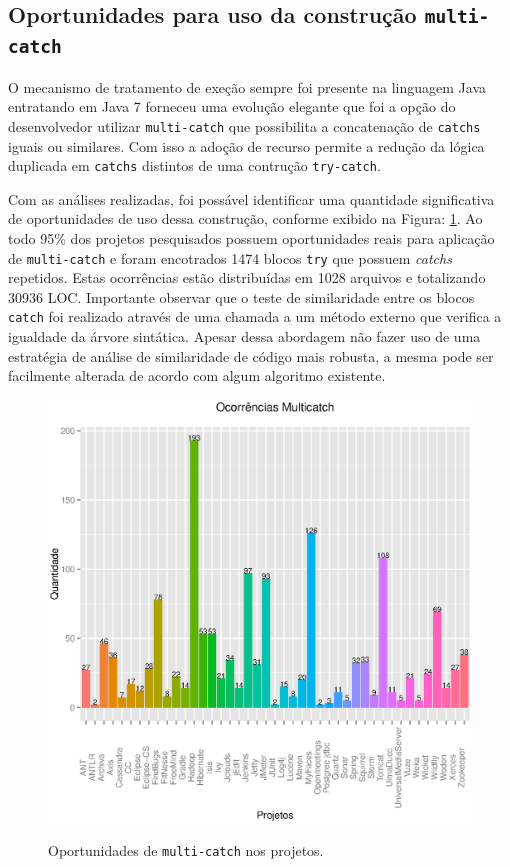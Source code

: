 \subsection{Oportunidades para uso da constru\c c\~{a}o \texttt{multi-catch}}

O mecanismo de tratamento de exeção sempre foi presente na linguagem Java entratando em Java 7 forneceu uma evolução elegante que foi a opção do desenvolvedor utilizar \texttt{multi-catch} que possibilita a concatenação de \texttt{catchs} iguais ou similares. Com isso a adoção de recurso permite a redução da lógica duplicada em \texttt{catchs} distintos de uma contrução \texttt{try-catch}.

Com as análises realizadas, foi possável identificar uma quantidade significativa de oportunidades 
de uso dessa construção, conforme exibido na Figura: \ref{fig:Muticatch}. Ao todo \num{95}\% dos projetos pesquisados possuem oportunidades reais para aplicação de \texttt{multi-catch} e
foram encotrados \num{1474} blocos \texttt{try} que possuem \textit{catchs} repetidos. 
Estas ocorrências estão distribuídas em \num{1028} arquivos e totalizando \num{30936} \acs{LOC}. 
Importante observar que o teste de  similaridade entre os blocos \texttt{catch} 
foi realizado através de uma chamada a um método externo que verifica a igualdade da árvore 
sintática. Apesar dessa abordagem não fazer uso de uma estratégia de análise 
de similaridade de código mais robusta, a mesma pode ser facilmente alterada de 
acordo com algum algoritmo existente. 

\begin{figure}[h]
	\center
	\includegraphics[scale=0.78]{Imagens/ocorrenciasMulticatch}
	\label{fig:Muticatch}
	\caption{Oportunidades de \texttt{multi-catch} nos projetos.}
\end{figure}
		
